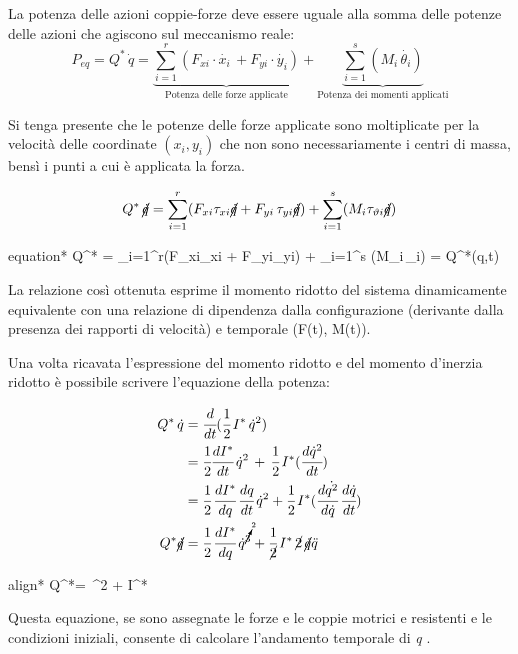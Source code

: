 	La potenza delle azioni coppie-forze deve essere uguale alla somma delle potenze delle azioni che agiscono sul meccanismo reale:
	\[
	P_{eq} = Q^*\,\dot{q} = \underbrace{\sum_{i=1}^{r} (F_{xi}\cdot\dot{x_i}\,+ F_{yi}\cdot\dot{y_i})}_{\text{Potenza delle forze applicate}} + \underbrace{\sum_{i=1}^{s}(M_i\,\dot{\theta_i})}_{\text{Potenza dei momenti applicati}}
		\]
	
	Si tenga presente che le potenze delle forze applicate sono moltiplicate per la velocità delle coordinate $(x_i,y_i)$ che non sono necessariamente i centri di massa, bensì i punti a cui è applicata la forza.
	
	\[
	Q^*\,\cancel{\dot{q}} = \sum_{i=1}^r (F_{xi}\tau_{xi}\cancel{\dot{q}} + F_{yi}\,\tau_{yi}\cancel{\dot{q}}) + \sum_{i=1}^s(M_i \tau_{\theta i }\cancel{\dot{q}})
	\]
	\begin{empheq}[box=%
	\fbox]{equation*}
		Q^* = \sum_{i=1}^r(F_{xi}\tau_{xi} + F_{yi}\tau_{yi}) + \sum_{i=1}^s (M_i\,\tau_{\theta i}) = Q^*(q,t)
	\end{empheq}
	
	La relazione così ottenuta esprime il momento ridotto del sistema dinamicamente equivalente con una relazione di dipendenza dalla configurazione (derivante dalla presenza dei rapporti di velocità) e temporale (F(t), M(t)).
	
	
	Una volta ricavata l'espressione del momento ridotto e del momento d'inerzia ridotto è possibile scrivere l'equazione della potenza:
	
	\begin{align*}
	Q^*\,\dot{q} &= \td{}{t}(\cfrac{1}{2}\,I^* \,\dot{q}^2)\\
	&= \cfrac{1}{2} \td{I^*}{t}\,\dot{q}^2\,+\,\cfrac{1}{2}\,I^*(\td{\dot{q}^2}{t})\\
	&= \cfrac{1}{2}\,\td{I^*}{q}\,\td{q}{t}\,\dot{q}^2 + \cfrac{1}{2}\,I^* (\td{\dot{q^2}}{\dot{q}}\,\td{\dot{q}}{t})\\
	Q^*\cancel{\dot{q}} &= \cfrac{1}{2}\,\td{I^*}{q}\,\dot{q}^{\cancelto{2}3} + \cfrac{1}{\cancel{2}}\,I^*\,\cancel{2}\,\cancel{\dot{q}}\ddot{q}
	\end{align*}
	
	\begin{empheq}[box=%
	\fbox]{align*}
		Q^*= \,^2 + I^*\,
	\end{empheq}
	
	Questa equazione, se sono assegnate le forze e le coppie motrici e resistenti e le condizioni iniziali, consente di calcolare l'andamento temporale di \emph{q}
.

